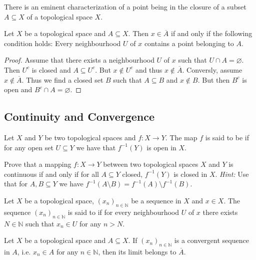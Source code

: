 There is an eminent characterization of a point being in the closure of a subset $A \subseteq X$ of a topological space $X$.

\begin{proposition}
	Let $X$ be a topological space and $A \subseteq X$. Then $x \in \overline{A}$ if and only if the following condition holds: Every neighbourhood $U$ of $x$ contains a point belonging to $A$.
	\label{prop:characterization_closure}
\end{proposition}

\begin{proof}
	Assume that there exists a neighbourhood $U$ of $x$ such that $U \cap A = \varnothing$. Then $U^c$ is closed and $A \subseteq U^c$. But $x \notin U^c$ and thus $x \notin \overline{A}$. Conversly, assume $x \notin \overline{A}$. Thus we find a closed set $B$ such that $A \subseteq B$ and $x \notin B$. But then $B^c$ is open and $B^c \cap A = \varnothing$.
\end{proof}

\subsection{Continuity and Convergence}

\begin{definition}
	Let $X$ and $Y$ be two topological spaces and $f: X \to Y$. The map $f$ is said to be  if for any open set $U \subseteq Y$ we have that $f^{-1}(Y)$ is open in $X$.
\end{definition}

\begin{exercise}
	Prove that a mapping $f: X \to Y$ between two topological spaces $X$ and $Y$ is continuous if and only if for all $A \subseteq Y$ closed, $f^{-1}(Y)$ is closed in $X$. \textit{Hint:} Use that for $A,B \subseteq Y$ we have $f^{-1}(A \setminus B) = f^{-1}(A) \setminus f^{-1}(B)$.
\end{exercise}
	
\begin{definition}
	Let $X$ be a topological space, $(x_n)_{n \in \mathbb{N}}$ be a sequence in $X$ and $x \in X$. The sequence $(x_n)_{n \in \mathbb{N}}$ is said to  if for every neighbourhood $U$ of $x$ there exists $N \in \mathbb{N}$ such that $x_n \in U$ for any $n > N$. 
\end{definition}

\begin{corollary}
	Let $X$ be a topological space and $A \subseteq X$. If $(x_n)_{n \in \mathbb{N}}$ is a convergent sequence in $A$, i.e. $x_n \in A$ for any $n \in \mathbb{N}$, then its limit belongs to $\overline{A}$.
	\label{cor:sequence_closure}
\end{corollary}

